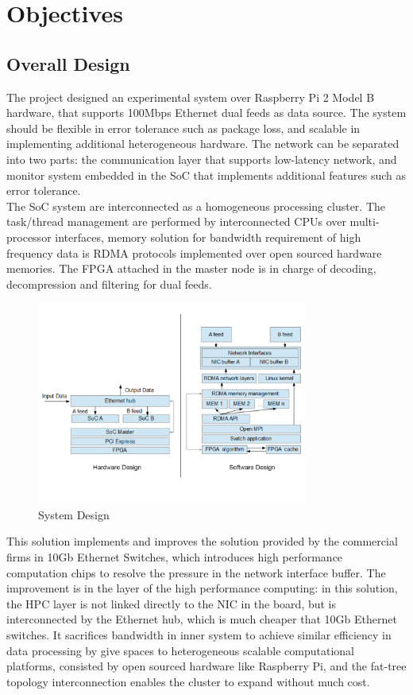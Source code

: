 \documentclass[11pt,openright,a4paper]{report}
\begin{document}
\section{Objectives}
\subsection{Overall Design}
The project designed an experimental system over Raspberry Pi 2 Model B hardware, that supports 100Mbps Ethernet dual feeds as data source. The system should be flexible in error tolerance such as package loss, and scalable in implementing additional heterogeneous hardware. The network can be separated into two parts: the communication layer that supports low-latency network, and monitor system embedded in the SoC that implements additional features such as error tolerance. \\ 
The SoC system are interconnected as a homogeneous processing cluster. The task/thread management are performed by interconnected CPUs over multi-processor interfaces, memory solution for bandwidth requirement of high frequency data is RDMA protocols implemented over open sourced hardware memories. The FPGA attached in the master node is in charge of decoding, decompression and filtering for dual feeds.\\
\begin{figure}[htbp]
	\centering\includegraphics[width=3.5in]{picture/System_Design.jpg}
	\caption{System Design}
	\label{fig:system_design}
\end{figure}
This solution implements and improves the solution provided by the commercial firms in 10Gb Ethernet Switches, which introduces high performance computation chips to resolve the pressure in the network interface buffer. The improvement is in the layer of the high performance computing: in this solution, the HPC layer is not linked directly to the NIC in the board, but is interconnected by the Ethernet hub, which is much cheaper that 10Gb Ethernet switches. It sacrifices bandwidth in inner system to achieve similar efficiency in data processing by give spaces to heterogeneous scalable computational platforms, consisted by open sourced hardware like Raspberry Pi, and the fat-tree topology interconnection enables the cluster to expand without much cost.\\
\end{document}
